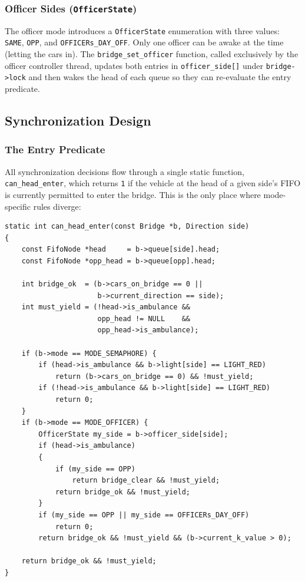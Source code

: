\documentclass[12pt]{article}
\begin{document}
\subsubsection{Officer Sides (\texttt{OfficerState})}

The officer mode introduces a \texttt{OfficerState} enumeration with three values: \texttt{SAME}, \texttt{OPP}, and \texttt{OFFICERs\_DAY\_OFF}.
Only one officer can be awake at the time (letting the cars in). The \texttt{bridge\_set\_officer}
function, called exclusively by the officer controller thread, updates
both entries in \texttt{officer\_side[]} under \texttt{bridge->lock} and then
wakes the head of each queue so they can re-evaluate the entry predicate.

\subsection{Synchronization Design}

\subsubsection{The Entry Predicate}

All synchronization decisions flow through a single static function,
\texttt{can\_head\_enter}, which returns \texttt{1} if the vehicle at the
head of a given side's FIFO is currently permitted to enter the bridge.
This is the only place where mode-specific rules diverge:

\begin{lstlisting}[style=cstyle, caption={Entry predicate (simplified from \texttt{bridge.c}).}]
static int can_head_enter(const Bridge *b, Direction side)
{
    const FifoNode *head     = b->queue[side].head;
    const FifoNode *opp_head = b->queue[opp].head;

    int bridge_ok  = (b->cars_on_bridge == 0 ||
                      b->current_direction == side);
    int must_yield = (!head->is_ambulance &&
                      opp_head != NULL    &&
                      opp_head->is_ambulance);

    if (b->mode == MODE_SEMAPHORE) {
        if (head->is_ambulance && b->light[side] == LIGHT_RED)
            return (b->cars_on_bridge == 0) && !must_yield;
        if (!head->is_ambulance && b->light[side] == LIGHT_RED)
            return 0;
    }
    if (b->mode == MODE_OFFICER) {
        OfficerState my_side = b->officer_side[side];
        if (head->is_ambulance)
        {
            if (my_side == OPP)
                return bridge_clear && !must_yield;
            return bridge_ok && !must_yield;
        }
        if (my_side == OPP || my_side == OFFICERs_DAY_OFF)
            return 0;
        return bridge_ok && !must_yield && (b->current_k_value > 0);

    return bridge_ok && !must_yield;
}
\end{lstlisting}
\end{document}
